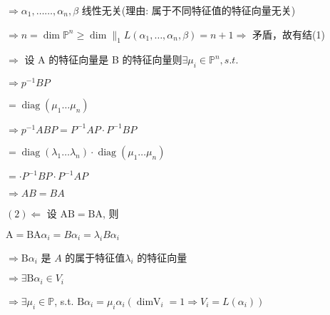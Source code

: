 \documentclass{article}
\begin{document}
$\Rightarrow \alpha_{1}, \ldots \ldots, \alpha_{n}, \beta$ 线性无关(理由: 属于不同特征值的特征向量无关)

$\Rightarrow n=\operatorname{dim} \mathbb{P}^{n} \geq \operatorname{dim} \|_{1}L\left(\alpha_{1}, \ldots, \alpha_{n}, \beta\right)=n+1 \Rightarrow$ 矛盾，故有结(1)

$\Rightarrow$ 设 $\mathrm{A}$ 的特征向量是 B 的特征向量则$\exists \mu_{i} \in \mathbb{P}^{n}, s.t .$

$\Rightarrow p^{-1} B P$

$=\operatorname{diag}\left(\mu_{1} \ldots \mu_{n}\right)$

$\Rightarrow p^{-1} A B P=P^{-1} A P \cdot P^{-1} B P$

$=\operatorname{diag}\left(\lambda_{1} \ldots \lambda_{n}\right) \cdot \operatorname{diag}\left(\mu_{1} \ldots \mu_{n}\right)$

$=\cdot P^{-1} B P \cdot P^{-1} A P$

$\Rightarrow A B=B A$

$(2) \Leftarrow$ 设 $\mathrm{AB}=\mathrm{BA}$, 则

$\mathrm{A}=\mathrm{BA} \alpha_{i}=B \alpha_{i}=\lambda_{i} B \alpha_{i}$

$\Rightarrow \mathrm{B} \alpha_{i}$ 是 $A$ 的属于特征值$\lambda_{i}$ 的特征向量

$\Rightarrow \exists \mathrm{B} \alpha_{i} \in V_{i}$

$\Rightarrow \exists \mu_{i} \in \mathbb{P}$, s.t. $\mathrm{B} \alpha_{i}=\mu_{i} \alpha_{i}\left(\operatorname{dimV}_{i}=1 \Rightarrow V_{i}=L\left(\alpha_{i}\right)\right)$
\end{document}
